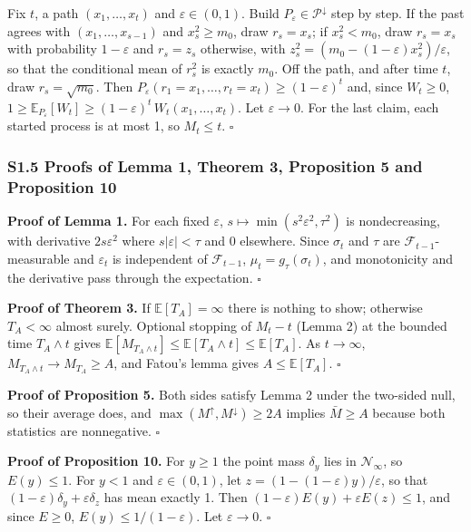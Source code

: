 \documentclass[
]{article}
\begin{document}
Fix \(t\), a path \((x_1, \dots, x_t)\) and \(\varepsilon \in (0, 1)\).
Build \(P_\varepsilon \in \mathcal{P}^{\downarrow}\) step by step. If
the past agrees with \((x_1, \dots, x_{s-1})\) and \(x_s^2 \ge m_0\),
draw \(r_s = x_s\); if \(x_s^2 < m_0\), draw \(r_s = x_s\) with
probability \(1 - \varepsilon\) and \(r_s = z_s\) otherwise, with
\(z_s^2 = (m_0 - (1-\varepsilon)x_s^2)/\varepsilon\), so that the
conditional mean of \(r_s^2\) is exactly \(m_0\). Off the path, and
after time \(t\), draw \(r_s = \sqrt{m_0}\). Then
\(P_\varepsilon(r_1 = x_1, \dots, r_t = x_t) \ge (1-\varepsilon)^t\)
and, since \(W_t \ge 0\),
\(1 \ge \mathbb{E}_{P_\varepsilon}[W_t] \ge (1-\varepsilon)^t\, W_t(x_1, \dots, x_t)\).
Let \(\varepsilon \to 0\). For the last claim, each started process is
at most 1, so \(M_t \le t\). \(\square\)

\hypertarget{s1.5-proofs-of-lemma-1-theorem-3-proposition-5-and-proposition-10}{%
\subsubsection{S1.5 Proofs of Lemma 1, Theorem 3, Proposition 5 and
Proposition
10}\label{s1.5-proofs-of-lemma-1-theorem-3-proposition-5-and-proposition-10}}

\textbf{Proof of Lemma 1.} For each fixed \(\varepsilon\),
\(s \mapsto \min(s^2\varepsilon^2, \tau^2)\) is nondecreasing, with
derivative \(2s\varepsilon^2\) where \(s\lvert\varepsilon\rvert < \tau\)
and 0 elsewhere. Since \(\sigma_t\) and \(\tau\) are
\(\mathcal{F}_{t-1}\)-measurable and \(\varepsilon_t\) is independent of
\(\mathcal{F}_{t-1}\), \(\mu_t = g_\tau(\sigma_t)\), and monotonicity
and the derivative pass through the expectation. \(\square\)

\textbf{Proof of Theorem 3.} If \(\mathbb{E}[T_A] = \infty\) there is
nothing to show; otherwise \(T_A < \infty\) almost surely. Optional
stopping of \(M_t - t\) (Lemma 2) at the bounded time \(T_A \wedge t\)
gives
\(\mathbb{E}[M_{T_A \wedge t}] \le \mathbb{E}[T_A \wedge t] \le \mathbb{E}[T_A]\).
As \(t \to \infty\), \(M_{T_A \wedge t} \to M_{T_A} \ge A\), and Fatou's
lemma gives \(A \le \mathbb{E}[T_A]\). \(\square\)

\textbf{Proof of Proposition 5.} Both sides satisfy Lemma 2 under the
two-sided null, so their average does, and
\(\max(M^{\uparrow}, M^{\downarrow}) \ge 2A\) implies \(\bar M \ge A\)
because both statistics are nonnegative. \(\square\)

\textbf{Proof of Proposition 10.} For \(y \ge 1\) the point mass
\(\delta_y\) lies in \(\mathcal{N}_\infty\), so \(E(y) \le 1\). For
\(y < 1\) and \(\varepsilon \in (0, 1)\), let
\(z = (1 - (1-\varepsilon)y)/\varepsilon\), so that
\((1-\varepsilon)\delta_y + \varepsilon \delta_z\) has mean exactly 1.
Then \((1-\varepsilon)E(y) + \varepsilon E(z) \le 1\), and since
\(E \ge 0\), \(E(y) \le 1/(1-\varepsilon)\). Let \(\varepsilon \to 0\).
\(\square\)
\end{document}
